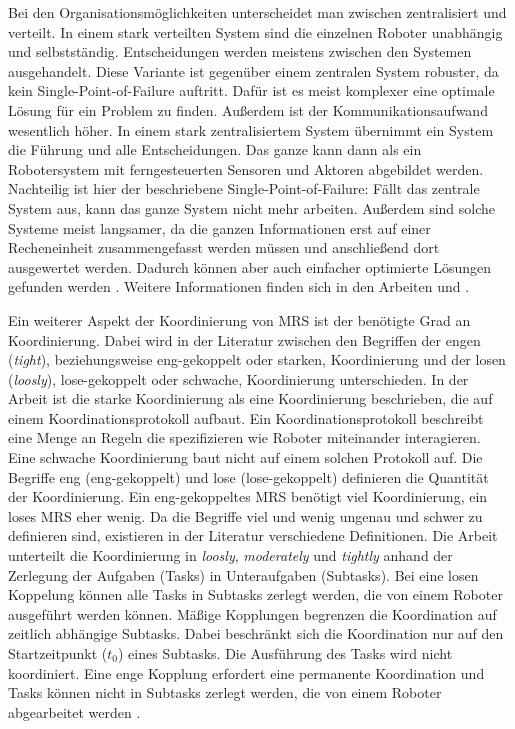 Bei den Organisationsmöglichkeiten unterscheidet man zwischen zentralisiert und verteilt. In einem stark verteilten System sind die einzelnen Roboter unabhängig und selbstständig. Entscheidungen werden meistens zwischen den Systemen ausgehandelt. Diese Variante ist gegenüber einem zentralen System robuster, da kein Single-Point-of-Failure auftritt. Dafür ist es meist komplexer eine optimale Lösung für ein Problem zu finden. Außerdem ist der Kommunikationsaufwand wesentlich höher. In einem stark zentralisiertem System übernimmt ein System die Führung und alle Entscheidungen. Das ganze kann dann als ein Robotersystem mit ferngesteuerten Sensoren und Aktoren abgebildet werden. Nachteilig ist hier der beschriebene Single-Point-of-Failure: Fällt das zentrale System aus, kann das ganze System nicht mehr arbeiten. Außerdem sind solche Systeme meist langsamer, da die ganzen Informationen erst auf einer Recheneinheit zusammengefasst werden müssen und anschließend dort ausgewertet werden. Dadurch können aber auch einfacher optimierte Lösungen gefunden werden \citep{lundh2006plan}. Weitere Informationen finden sich in den Arbeiten \cite{farinelli2004multirobot} und \cite{dias2003comparative}. 

Ein weiterer Aspekt der Koordinierung von MRS ist der benötigte Grad an Koordinierung. Dabei wird in der Literatur zwischen den Begriffen der engen (\textit{tight}), beziehungsweise eng-gekoppelt oder starken, Koordinierung und der losen (\textit{loosly}), lose-gekoppelt oder schwache, Koordinierung unterschieden. In der Arbeit \cite{farinelli2004multirobot} ist die starke Koordinierung als eine Koordinierung beschrieben, die auf einem Koordinationsprotokoll aufbaut. Ein Koordinationsprotokoll beschreibt eine Menge an Regeln die spezifizieren wie Roboter miteinander interagieren. Eine schwache Koordinierung baut nicht auf einem solchen Protokoll auf. Die Begriffe eng (eng-gekoppelt) und lose (lose-gekoppelt) definieren die Quantität der Koordinierung. Ein eng-gekoppeltes MRS benötigt viel Koordinierung, ein loses MRS eher wenig. Da die Begriffe viel und wenig ungenau und schwer zu definieren sind, existieren in der Literatur verschiedene Definitionen. Die Arbeit \cite{kalra2004hoplites} unterteilt die Koordinierung in \textit{loosly}, \textit{moderately} und \textit{tightly} anhand der Zerlegung der Aufgaben (Tasks) in Unteraufgaben (Subtasks). Bei eine losen Koppelung können alle Tasks in Subtasks zerlegt werden, die von einem Roboter ausgeführt werden können. Mäßige Kopplungen begrenzen die Koordination auf zeitlich abhängige Subtasks. Dabei beschränkt sich die Koordination nur auf den Startzeitpunkt ($t_0$) eines Subtasks. Die Ausführung des Tasks wird nicht koordiniert. Eine enge Kopplung erfordert eine permanente Koordination und Tasks können nicht in Subtasks zerlegt werden, die von einem Roboter abgearbeitet werden \citep{lundh2006plan}.

